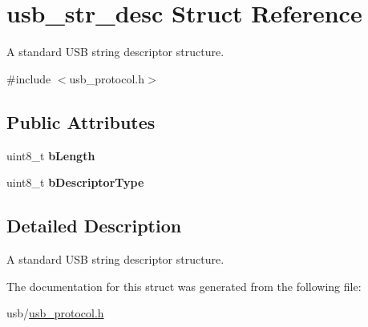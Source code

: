 \hypertarget{structusb__str__desc}{}\section{usb\+\_\+str\+\_\+desc Struct Reference}
\label{structusb__str__desc}


A standard U\+SB string descriptor structure.  




{\ttfamily \#include $<$usb\+\_\+protocol.\+h$>$}

\subsection*{Public Attributes}
\begin{DoxyCompactItemize}
\item 
\mbox{\label{structusb__str__desc_a493448a65e5334f56d50fae3df8c98cc}} 
uint8\+\_\+t {\bfseries b\+Length}
\item 
\mbox{\label{structusb__str__desc_a0a132f7dcfa08623ac5249685d36a801}} 
uint8\+\_\+t {\bfseries b\+Descriptor\+Type}
\end{DoxyCompactItemize}


\subsection{Detailed Description}
A standard U\+SB string descriptor structure. 

The documentation for this struct was generated from the following file\+:\begin{DoxyCompactItemize}
\item 
usb/\hyperlink{usb__protocol_8h}{usb\+\_\+protocol.\+h}\end{DoxyCompactItemize}
